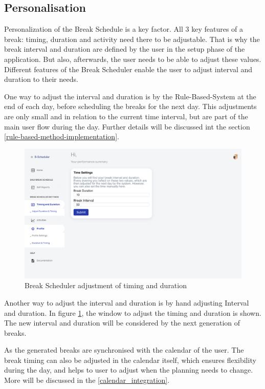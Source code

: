 \documentclass{hasel_thesis}
\begin{document}
\subsection{Personalisation} \label{personalization}
Personalization of the Break Schedule is a key factor. All 3 key features of a break: timing, duration and activity need there to be adjustable. That is why the break interval and duration are defined by the user in the setup phase of the application. But also, afterwards, the user needs to be able to adjust these values. Different features of the Break Scheduler enable the user to adjust interval and duration to their needs.

One way to adjust the interval and duration is by the Rule-Based-System at the end of each day, before scheduling the breaks for the next day. This adjustments are only small and in relation to the current time interval, but are part of the main user flow during the day. Further details will be discussed int the section \ref{rule-based-method-implementation}.

\begin{figure}[htp]
    \centering
    \includegraphics[width=15cm]{hasel_thesis/images/adjust_timing.png}
    \caption{Break Scheduler adjustment of timing and duration}
    \label{fig:adjust_timing}
\end{figure}

Another way to adjust the interval and duration is by hand adjusting Interval and duration. In figure \ref{fig:adjust_timing}, the window to adjust the timing and duration is shown. The new interval and duration will be considered by the next generation of breaks.

As the generated breaks are synchronised with the calendar of the user. The break timing can also be adjusted in the calendar itself, which ensures flexibility during the day, and helps to user to adjust when the planning needs to change. More will be discussed in the \ref{calendar_integration}.
\end{document}
